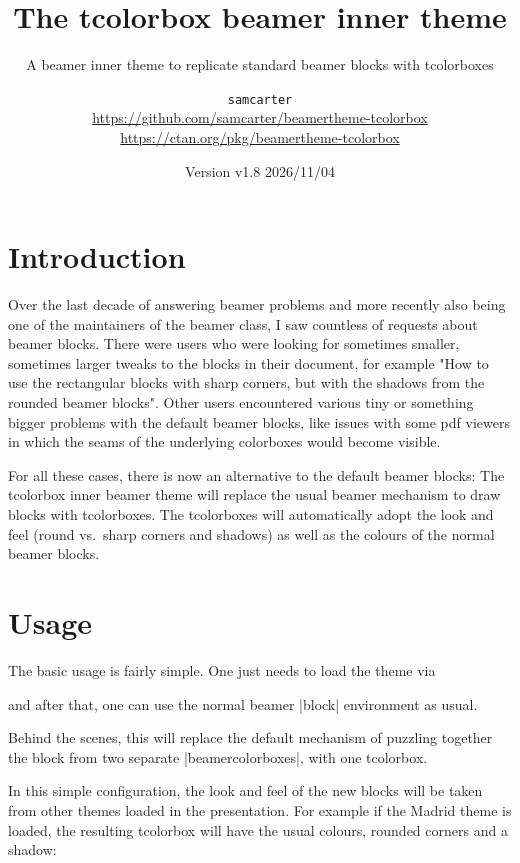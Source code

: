 \documentclass{scrartcl}
\title{The tcolorbox beamer inner theme}
\subtitle{A beamer inner theme to replicate standard beamer blocks with tcolorboxes}
\author{%
  \texorpdfstring{
    \texttt{samcarter}\\
    \url{https://github.com/samcarter/beamertheme-tcolorbox}\\
    \url{https://ctan.org/pkg/beamertheme-tcolorbox}
  }{samcarter}}
\date{Version v1.8 \textendash{} 2026/11/04}
\begin{document}
\maketitle

\section{Introduction}
\label{intro}

Over the last decade of answering beamer problems and more recently also being one of the maintainers of the beamer class, I saw countless of requests about beamer blocks. There were users who were looking for sometimes smaller, sometimes larger tweaks to the blocks in their document, for example "How to use the rectangular blocks with sharp corners, but with the shadows from the rounded beamer blocks". Other users encountered various tiny or something bigger problems with the default beamer blocks, like issues with some pdf viewers in which the seams of the underlying colorboxes would become visible.

For all these cases, there is now an alternative to the default beamer blocks: The tcolorbox inner beamer theme will replace the usual beamer mechanism to draw blocks with tcolorboxes. The tcolorboxes will automatically adopt the look and feel (round vs.\ sharp corners and shadows) as well as the colours of the normal beamer blocks.

\blurb

\section{Usage}

The basic usage is fairly simple. One just needs to load the theme via
\begin{tcolorbox}[lower separated=false,title={Usage}]
\begin{samcode}
\end{samcode}
\end{tcolorbox}
and after that, one can use the normal beamer \saminline|block| environment as usual.

Behind the scenes, this will replace the default mechanism of puzzling together the block from two separate \saminline|beamercolorboxes|, with one tcolorbox.

In this simple configuration, the look and feel of the new blocks will be taken from other themes loaded in the presentation. For example if the Madrid theme is loaded, the resulting tcolorbox will have the usual colours, rounded corners and a shadow:
\end{document}
